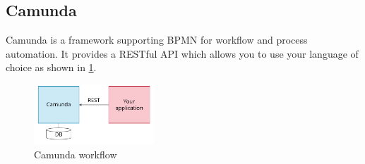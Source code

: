 \documentclass[10pt,a4paper]{report}
\begin{document}
\subsection{Camunda}
 Camunda is a framework supporting BPMN for workflow and process
automation. It provides a RESTful API which allows you to use your language of
choice as shown in \ref{image-camunda-arch}.
\begin{figure}[h]
	\centering
	\includegraphics[width=0.4\textwidth]{camunda-arch}
	\caption{Camunda workflow}
	\label{image-camunda-arch}
\end{figure}
\end{document}
